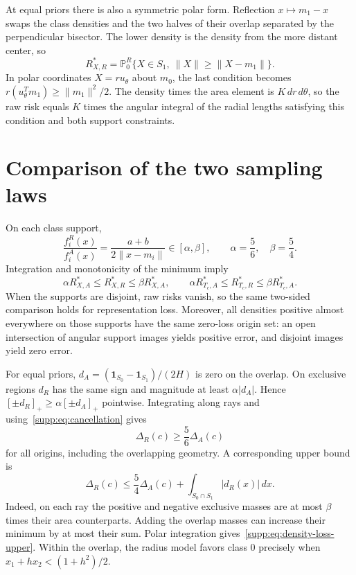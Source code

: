 At equal priors there is also a symmetric polar form. Reflection $x\mapsto m_1-x$ swaps the class densities and the two halves of their overlap separated by the perpendicular bisector. The lower density is the density from the more distant center, so
\begin{equation}
 R_{X,R}^*
 =\mathbb P_0^R\{X\in S_1,\ \|X\|\geq\|X-m_1\|\}.
 \label{supp:eq:raw-radius-symmetry}
\end{equation}
In polar coordinates $X=ru_\theta$ about $m_0$, the last condition becomes
$r(u_\theta^Tm_1)\geq\|m_1\|^2/2$. The density times the area element is $K\,dr\,d\theta$, so the raw risk equals $K$ times the angular integral of the radial lengths satisfying this condition and both support constraints.

\section{Comparison of the two sampling laws}
\label{supp:density}

On each class support,
\begin{equation}
 \frac{f_i^R(x)}{f_i^A(x)}
 =\frac{a+b}{2\|x-m_i\|}\in[\alpha,\beta],
 \qquad\alpha=\frac56,\quad\beta=\frac54.
 \label{supp:eq:density-ratio}
\end{equation}
Integration and monotonicity of the minimum imply
\[
 \alpha R_{X,A}^*\leq R_{X,R}^*\leq\beta R_{X,A}^*,
 \qquad
 \alpha R_{T_c,A}^*\leq R_{T_c,R}^*\leq\beta R_{T_c,A}^*.
\]
When the supports are disjoint, raw risks vanish, so the same two-sided comparison holds for representation loss. Moreover, all densities positive almost everywhere on those supports have the same zero-loss origin set: an open intersection of angular support images yields positive error, and disjoint images yield zero error.

For equal priors, $d_A=(\mathbf1_{S_0}-\mathbf1_{S_1})/(2H)$ is zero on the overlap. On exclusive regions $d_R$ has the same sign and magnitude at least $\alpha|d_A|$. Hence $[\pm d_R]_+\geq\alpha[\pm d_A]_+$ pointwise. Integrating along rays and using~\eqref{supp:eq:cancellation} gives
\begin{equation}
 \Delta_R(c)\geq\frac56\Delta_A(c)
 \label{supp:eq:density-loss-lower}
\end{equation}
for all origins, including the overlapping geometry. A corresponding upper bound is
\begin{equation}
 \Delta_R(c)\leq\frac54\Delta_A(c)
      +\int_{S_0\cap S_1}|d_R(x)|\,dx.
 \label{supp:eq:density-loss-upper}
\end{equation}
Indeed, on each ray the positive and negative exclusive masses are at most $\beta$ times their area counterparts. Adding the overlap masses can increase their minimum by at most their sum. Polar integration gives~\eqref{supp:eq:density-loss-upper}. Within the overlap, the radius model favors class 0 precisely when $x_1+hx_2<(1+h^2)/2$.


